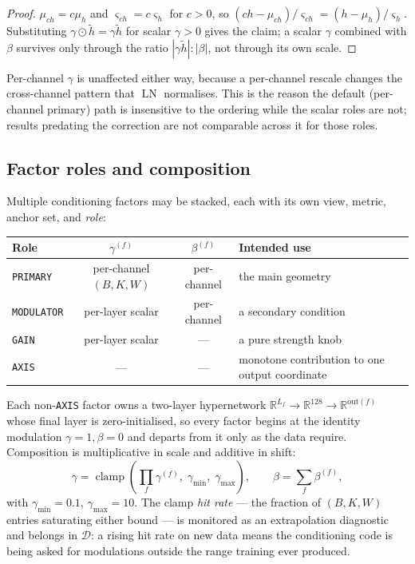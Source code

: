 \documentclass[12pt]{iopart}
\theoremstyle{definition}
\theoremstyle{plain}
\theoremstyle{remark}
\newcommand{\R}{\mathbb{R}}
\newcommand{\abs}[1]{\left\lvert#1\right\rvert}
\DeclareMathOperator{\LN}{LN}
\DeclareMathOperator{\clamp}{clamp}
\newcommand{\code}[1]{\texttt{#1}}
\begin{document}
\begin{proof}
$\mu_{ch}=c\mu_h$ and $\varsigma_{ch}=c\varsigma_h$ for $c>0$, so
$(ch-\mu_{ch})/\varsigma_{ch}=(h-\mu_h)/\varsigma_h$. Substituting
$\gamma\odot\tilde h=\gamma\tilde h$ for scalar $\gamma>0$ gives the claim; a
scalar $\gamma$ combined with $\beta$ survives only through the ratio
$\abs{\gamma\tilde h}:\abs{\beta}$, not through its own scale.
\end{proof}

Per-channel $\gamma$ is unaffected either way, because a per-channel rescale
changes the cross-channel pattern that $\LN$ normalises. This is the reason the
default (per-channel primary) path is insensitive to the ordering while the
scalar roles are not; results predating the correction are not comparable
across it for those roles.

\subsection{Factor roles and composition}
\label{sec:roles}

Multiple conditioning factors may be stacked, each with its own view, metric,
anchor set, and \emph{role}:

\begin{center}
\small
\begin{tabular}{lccl}
\toprule
Role & $\gamma^{(f)}$ & $\beta^{(f)}$ & Intended use \\
\midrule
\code{PRIMARY} & per-channel $(B,K,W)$ & per-channel & the main geometry \\
\code{MODULATOR} & per-layer scalar & per-channel & a secondary condition \\
\code{GAIN} & per-layer scalar & --- & a pure strength knob \\
\code{AXIS} & --- & --- & monotone contribution to one output coordinate \\
\bottomrule
\end{tabular}
\end{center}

Each non-\code{AXIS} factor owns a two-layer hypernetwork
$\R^{L_f}\to\R^{128}\to\R^{\mathrm{out}(f)}$ whose final layer is
zero-initialised, so every factor begins at the identity modulation
$\gamma=1,\beta=0$ and departs from it only as the data require. Composition is
multiplicative in scale and additive in shift:
\begin{equation}
\label{eq:filmcompose}
\gamma
=
\clamp\!\left(\prod_f\gamma^{(f)},\;\gamma_{\min},\;\gamma_{\max}\right),
\qquad
\beta = \sum_f \beta^{(f)},
\end{equation}
with $\gamma_{\min}=0.1$, $\gamma_{\max}=10$. The clamp \emph{hit rate} --- the
fraction of $(B,K,W)$ entries saturating either bound --- is monitored as an
extrapolation diagnostic and belongs in $\mathcal{D}$: a rising hit rate on new
data means the conditioning code is being asked for modulations outside the
range training ever produced.
\end{document}
